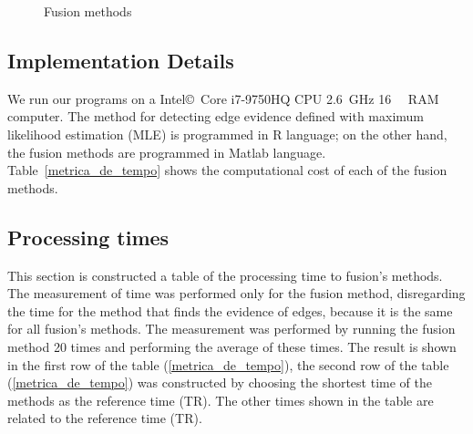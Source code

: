 \documentclass[journal]{IEEEtran}
\begin{document}
\begin{figure}[hbt]
{     }
     \caption{Fusion methods}
     \label{fusion_met}
\end{figure}

\subsection{Implementation Details}

We run our programs on a Intel\copyright\ Core i7-9750HQ CPU \SI{2.6}{\giga\hertz} \SI{16}{\giga\byte} RAM computer.  
The method for detecting edge evidence defined with maximum likelihood estimation (MLE) is programmed in R language; on the other hand, the fusion methods are programmed in Matlab language. 
Table~\ref{metrica_de_tempo} shows the computational cost of each of the fusion methods.

\subsection{Processing times} 

This section is constructed a table of the processing time to fusion's methods. The measurement of time was performed only for the fusion method, disregarding the time for the method that finds the evidence of edges, because it is the same for all fusion's methods. The measurement was performed by running the fusion method 20 times and performing the average of these times. The result is shown in the first row of the table (\ref{metrica_de_tempo}), the second row of the table  (\ref{metrica_de_tempo}) was constructed by choosing the shortest time of the methods as the reference time (TR). The other times shown in the table are related to the reference time (TR).   
\end{document}
